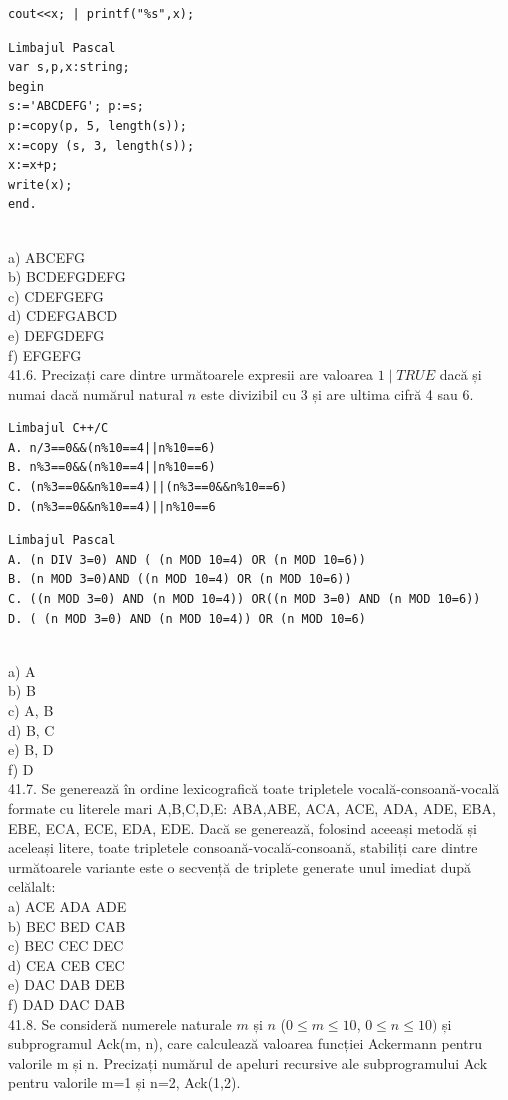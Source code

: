 \begin{itemize}
\begin{enumerate}
\begin{verbatim}
cout<<x; | printf("%s",x);
\end{verbatim}
\begin{verbatim}
Limbajul Pascal
var s,p,x:string;
begin
s:='ABCDEFG'; p:=s;
p:=copy(p, 5, length(s));
x:=copy (s, 3, length(s));
x:=x+p;
write(x);
end.
\end{verbatim}
\\
a) ABCEFG
\\
b) BCDEFGDEFG
\\
c) CDEFGEFG
\\
d) CDEFGABCD
\\
e) DEFGDEFG
\\
f) EFGEFG
\\
41.6. Precizați care dintre următoarele expresii are valoarea $1 \mid TRUE$ dacă și numai dacă numărul natural $n$ este divizibil cu 3 și are ultima cifră 4 sau 6.
\begin{verbatim}
Limbajul C++/C
A. n/3==0&&(n%10==4||n%10==6)
B. n%3==0&&(n%10==4||n%10==6)
C. (n%3==0&&n%10==4)||(n%3==0&&n%10==6)
D. (n%3==0&&n%10==4)||n%10==6
\end{verbatim}
\begin{verbatim}
Limbajul Pascal
A. (n DIV 3=0) AND ( (n MOD 10=4) OR (n MOD 10=6))
B. (n MOD 3=0)AND ((n MOD 10=4) OR (n MOD 10=6))
C. ((n MOD 3=0) AND (n MOD 10=4)) OR((n MOD 3=0) AND (n MOD 10=6))
D. ( (n MOD 3=0) AND (n MOD 10=4)) OR (n MOD 10=6)
\end{verbatim}
\\
a) A
\\
b) B
\\
c) A, B
\\
d) B, C
\\
e) B, D
\\
f) D
\\
41.7. Se generează în ordine lexicografică toate tripletele vocală-consoană-vocală formate cu literele mari A,B,C,D,E: ABA,ABE, ACA, ACE, ADA, ADE, EBA, EBE, ECA, ECE, EDA, EDE. Dacă se generează, folosind aceeași metodă și aceleași litere, toate tripletele consoană-vocală-consoană, stabiliți care dintre următoarele variante este o secvență de triplete generate unul imediat după celălalt:
\\
a) ACE ADA ADE
\\
b) BEC BED CAB
\\
c) BEC CEC DEC
\\
d) CEA CEB CEC
\\
e) DAC DAB DEB
\\
f) DAD DAC DAB
\\
41.8. Se consideră numerele naturale $m$ și $n$ ($0 \leq m \leq 10$, $0 \leq n \leq 10)$ și subprogramul Ack(m, n), care calculează valoarea funcției Ackermann pentru valorile m și n. Precizați numărul de apeluri recursive ale subprogramului Ack pentru valorile m=1 și n=2, Ack(1,2).

\end{enumerate}
\end{itemize}
